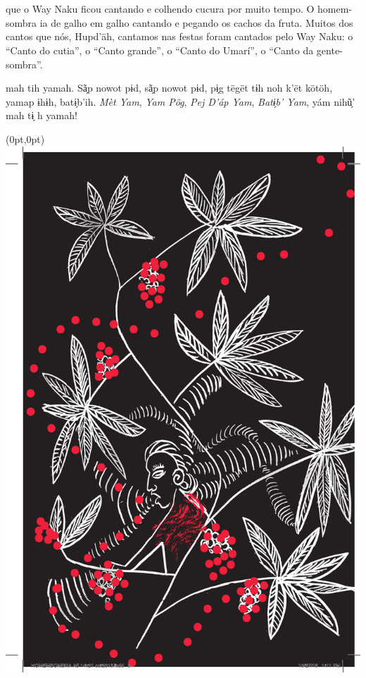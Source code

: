 \chapter*{}

\mbox{}\vspace*{\fill}

 que o Way Naku ficou
cantando e colhendo cucura
por muito tempo. O homem-sombra
ia de galho em galho
cantando e pegando os cachos
da fruta. Muitos dos cantos
que nós, Hupd’äh, cantamos nas
festas foram cantados pelo Way
Naku: o ``Canto do cutia'', o ``Canto
grande'', o ``Canto do Umarí'', o
``Canto da gente-sombra''.

\vspace{2em}

 mah tih yamah. Sã̗p nowot
pɨd, sã̗p nowot pɨd, pɨ̗g tëgët
tɨh noh k’ët kötöh, yamap ɨhɨh,
batɨ̗b’ih. \textit{Mèt Yam}, \textit{Yam Pög}, \textit{Pej
D’áp Yam}, \textit{Batɨ̗b’ Yam}, yám nihũ̗’
mah tɨ̗ h yamah!

\vspace*{\fill}

\pagebreak

\begin{textblock*}{8in}(0pt,0pt)%
\vspace*{-2.8cm}
\hspace*{-3.2cm}\includegraphics[width=153mm]{./imgs/img3.pdf}
\end{textblock*}

